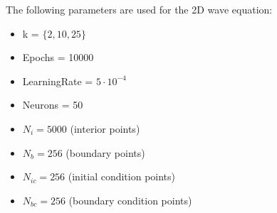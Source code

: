 \documentclass[11pt]{article}
\begin{document}
The following parameters are used for the 2D wave equation:
\begin{itemize}
    \item k = $\lbrace 2, 10, 25 \rbrace$
    \item Epochs = 10000
    \item LearningRate = $5 \cdot 10^{-4}$
    \item Neurons = 50
    \item $N_{i}  = 5000$ (interior points)
    \item $N_{b}  = 256$  (boundary points)
    \item $N_{ic} = 256$  (initial condition points)
    \item $N_{bc} = 256$  (boundary condition points)
\end{itemize}
\end{document}
